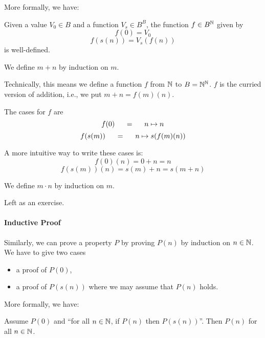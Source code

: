 More formally, we have:
\begin{theorem}
Given a value $V_0\in B$ and a function $V_s\in B^B$, the function $f\in B^{\mathbb{N}}$ given by
 \[f(0)=V_0\]
 \[f(s(n))=V_s(f(n))\]
is well-defined.
\end{theorem}


\begin{example}[Addition]\label{ex:induction:add}
We define $m+n$ by induction on $m$.

Technically, this means we define a function $f$ from $\mathbb{N}$ to $B=\mathbb{N}^{\mathbb{N}}$.
$f$ is the curried version of addition, i.e., we put $m+n=f(m)(n)$.

The cases for $f$ are
  \[f(0) \hspace*{.5cm}=\hspace*{.5cm} n\mapsto n\]
  \[f(s(m)) \hspace*{.5cm}=\hspace*{.5cm} n\mapsto s(f(m)(n))\]

A more intuitive way to write these cases is:
  \[f(0)(n) = 0+n = n\]
  \[f(s(m))(n) = s(m)+n = s(m+n)\]
\end{example}

\begin{example}[Multiplication]\label{ex:induction:mult}
We define $m\cdot n$ by induction on $m$.

Left as an exercise.
\end{example}

\paragraph{Inductive Proof}
Similarly, we can prove a property $P$ by proving $P(n)$ by induction on $n\in\mathbb{N}$.
We have to give two cases
 \begin{itemize}
   \item a proof of $P(0)$,
   \item a proof of $P(s(n))$ where we may assume that $P(n)$ holds.
 \end{itemize}

More formally, we have:
\begin{theorem}
Assume $P(0)$ and ``for all $n\in\mathbb{N}$, if $P(n)$ then $P(s(n))$''.
Then $P(n)$ for all $n\in\mathbb{N}$.
\end{theorem}

